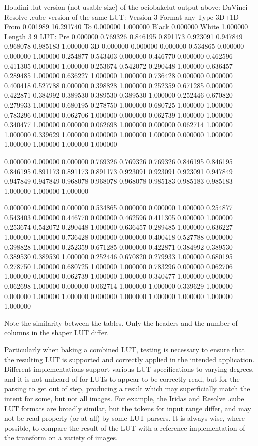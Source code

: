 Houdini .lut version (not usable size) of the ociobakelut output above:
DaVinci Resolve .cube version of the same LUT:
Version		3
Format		any
Type		3D+1D
From		0.001989 16.291740
To		0.000000 1.000000
Black		0.000000
White		1.000000
Length		3 9
LUT:
Pre {
	0.000000
	0.769326
	0.846195
	0.891173
	0.923091
	0.947849
	0.968078
	0.985183
	1.000000
}
3D {
	0.000000 0.000000 0.000000
	0.534865 0.000000 0.000000
	1.000000 0.254877 0.543403
	0.000000 0.446770 0.000000
	0.462596 0.411305 0.000000
	1.000000 0.253674 0.542072
	0.290448 1.000000 0.636457
	0.289485 1.000000 0.636227
	1.000000 1.000000 0.736428
	0.000000 0.000000 0.400418
	0.527788 0.000000 0.398828
	1.000000 0.252359 0.671285
	0.000000 0.422871 0.384992
	0.389530 0.389530 0.389530
	1.000000 0.252446 0.670820
	0.279933 1.000000 0.680195
	0.278750 1.000000 0.680725
	1.000000 1.000000 0.783296
	0.000000 0.062706 1.000000
	0.000000 0.062739 1.000000
	1.000000 0.340477 1.000000
	0.000000 0.062698 1.000000
	0.000000 0.062714 1.000000
	1.000000 0.339629 1.000000
	0.000000 1.000000 1.000000
	0.000000 1.000000 1.000000
	1.000000 1.000000 1.000000
 }


0.000000 0.000000 0.000000
0.769326 0.769326 0.769326
0.846195 0.846195 0.846195
0.891173 0.891173 0.891173
0.923091 0.923091 0.923091
0.947849 0.947849 0.947849
0.968078 0.968078 0.968078
0.985183 0.985183 0.985183
1.000000 1.000000 1.000000

0.000000 0.000000 0.000000
0.534865 0.000000 0.000000
1.000000 0.254877 0.543403
0.000000 0.446770 0.000000
0.462596 0.411305 0.000000
1.000000 0.253674 0.542072
0.290448 1.000000 0.636457
0.289485 1.000000 0.636227
1.000000 1.000000 0.736428
0.000000 0.000000 0.400418
0.527788 0.000000 0.398828
1.000000 0.252359 0.671285
0.000000 0.422871 0.384992
0.389530 0.389530 0.389530
1.000000 0.252446 0.670820
0.279933 1.000000 0.680195
0.278750 1.000000 0.680725
1.000000 1.000000 0.783296
0.000000 0.062706 1.000000
0.000000 0.062739 1.000000
1.000000 0.340477 1.000000
0.000000 0.062698 1.000000
0.000000 0.062714 1.000000
1.000000 0.339629 1.000000
0.000000 1.000000 1.000000
0.000000 1.000000 1.000000
1.000000 1.000000 1.000000

Note the similarity between the tables. Only the headers and the number of columns in the shaper LUT differ.

Particularly when baking a combined LUT, testing is necessary to ensure that the resulting LUT is supported and correctly applied in the intended application. Different implementations support various LUT specifications to varying degrees, and it is not unheard of for LUTs to appear to be correctly read, but for the parsing to get out of step, producing a result which may superficially match the intent for some, but not all images. For example, the Iridas and Resolve .cube LUT formats are broadly similar, but the tokens for input range differ, and may not be read properly (or at all) by some LUT parsers. It is always wise, where possible, to compare the result of the LUT with a reference implementation of the transform on a variety of images.

